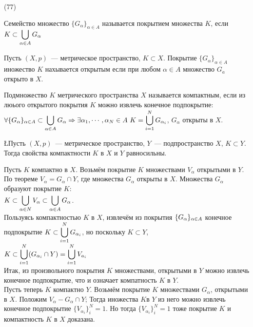 (77)

\Op Семейство множество $\{G_\alpha\}_{\alpha \in A}$ называется покрытием множества $K$, если $K \subset \ds\bigcup_{\alpha \in A} G_\alpha$

\Op Пусть $(X, p)$~--- метрическое пространство, $K \subset X$. Покрытие $\{G_\alpha\}_{\alpha \in A}$ иножество $K$ нахывается открытым если при любом $\alpha \in A$ множество $G_a$ открыто в $X$.

\Op Подмножество $K$ метрического пространства $X$ называется компактным, если из люього открытого покрытия $K$ можно извлечь конечное подпокрытие:\\
$\forall\{G_\alpha\}_{\alpha \in A} \subset \ds\bigcup\limits_{\alpha\in A}G_\alpha \Ra \exists\alpha_1, \cdots, \alpha_N \in A\ K = \bigcup^N_{i = 1} G_{\alpha_i}$, $G_\alpha$ открыты в $X$.

\L Пусть $(X, p)$~--- метрическое пространство, $Y$~--- подпространство $X$, $K \subset Y$. Тогда свойства компактности $K$ в $X$ и $Y$ равносильны.

\D Пусть $K$ компактно в $X$. Возьмём покрытие $K$ множествами $V_\alpha$ открытыми в $Y$. По теореме $V_\alpha = G_\alpha \cap Y$, где множества $G_\alpha$ открыты в $X$. Множества $G_\alpha$ образуют покрытие $K$:\\
$K \subset \dsl \bigcup{\alpha \in N}{} V_\alpha \subset \dsl\bigcup{\alpha \in A}{} G_\alpha$.\\
Пользуясь компактностью $K$ в $X$, извлечём из покрытия $\iseq G\alpha A$ конечное подпокрытие $K \subset \dsl \bigcup{i = 1}N G_{\alpha_i}$, но поскольку $K\subset Y$,\\
$K \subset \dsl\bigcup{i=1}{N}(G_{\alpha_i}\cap Y) = \dsl \bigcup{i = 1}N V_{a_i}$\\
Итак, из произвольного покрытия $K$ множествами, открытыми в $Y$ можно извлечь конечное подпокрытие, что и означает компатность $K$ в $Y$.\\
Пусть теперь $K$ компактно $Y$. Возьмём покрытие $K$ множествами $G_\alpha$, открытыми в $X$. Положим $V_\alpha - G_\alpha \cap Y$; Тогда иножества $K$в $Y$ из него можно извлечь конечное подпокрытие $\{V_{\alpha_i}\}^N_i = 1$. Но тогда $\{V_{\alpha_i}\}^N_i = 1$ тоже покрытие $K$ и компактность $K$ в $X$ доказана.